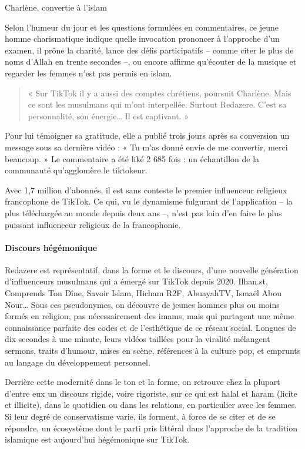 Charlène, convertie à l’islam

Selon l’humeur du jour et les questions formulées en commentaires, ce jeune homme charismatique indique quelle invocation prononcer à l’approche d’un examen, il prône la charité, lance des défis participatifs – comme citer le plus de noms d’Allah en trente secondes –, ou encore affirme qu’écouter de la musique et regarder les femmes n’est pas permis en islam.
 
 \begin{quote}
     « Sur TikTok il y a aussi des comptes chrétiens, poursuit Charlène. Mais ce sont les musulmans qui m’ont interpellée. Surtout Redazere. C’est sa personnalité, son énergie… Il est captivant. »
 \end{quote}
 Pour lui témoigner sa gratitude, elle a publié trois jours après sa conversion un message sous sa dernière vidéo : « Tu m’as donné envie de me convertir, merci beaucoup. » Le commentaire a été liké 2 685 fois : un échantillon de la communauté qu’agglomère le tiktokeur.

Avec 1,7 million d’abonnés, il est sans conteste le premier influenceur religieux francophone de TikTok. Ce qui, vu le dynamisme fulgurant de l’application – la plus téléchargée au monde depuis deux ans –, n’est pas loin d’en faire le plus puissant influenceur religieux de la francophonie.

\paragraph{Discours hégémonique}
Redazere est représentatif, dans la forme et le discours, d’une nouvelle génération d’influenceurs musulmans qui a émergé sur TikTok depuis 2020. Ilhan.st, Comprends Ton Dîne, Savoir Islam, Hicham R2F, AbuayahTV, Ismaël Abou Nour… Sous ces pseudonymes, on découvre de jeunes hommes plus ou moins formés en religion, pas nécessairement des imams, mais qui partagent une même connaissance parfaite des codes et de l’esthétique de ce réseau social. Longues de dix secondes à une minute, leurs vidéos taillées pour la viralité mélangent sermons, traits d’humour, mises en scène, références à la culture pop, et emprunts au langage du développement personnel.

 

Derrière cette modernité dans le ton et la forme, on retrouve chez la plupart d’entre eux un discours rigide, voire rigoriste, sur ce qui est halal et haram (licite et illicite), dans le quotidien ou dans les relations, en particulier avec les femmes. Si leur degré de conservatisme varie, ils forment, à force de se citer et de se répondre, un écosystème dont le parti pris littéral dans l’approche de la tradition islamique est aujourd’hui hégémonique sur TikTok.


